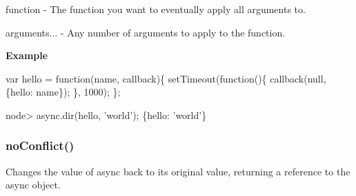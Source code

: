 \begin{DoxyItemize}
\item {\ttfamily function} -\/ The function you want to eventually apply all arguments to.
\item {\ttfamily arguments...} -\/ Any number of arguments to apply to the function.
\end{DoxyItemize}

{\bfseries Example}


\begin{DoxyCode}
var hello = \textcolor{keyword}{function}(name, callback)\{
    setTimeout(\textcolor{keyword}{function}()\{
        callback(null, \{hello: name\});
    \}, 1000);
\};
\end{DoxyCode}
 
\begin{DoxyCode}
node> async.dir(hello, \textcolor{stringliteral}{'world'});
\{hello: \textcolor{stringliteral}{'world'}\}
\end{DoxyCode}
 



\label{_noConflict}%
 \subsubsection*{no\+Conflict()}

Changes the value of {\ttfamily async} back to its original value, returning a reference to the {\ttfamily async} object. 